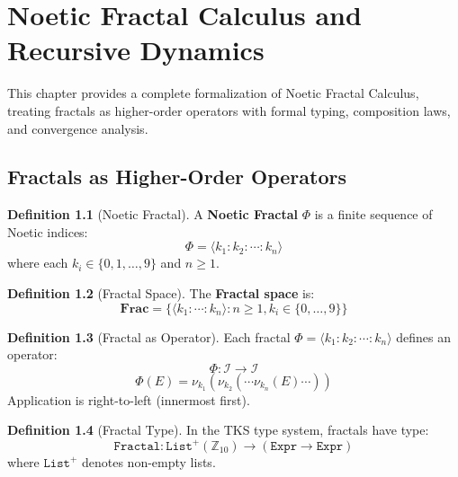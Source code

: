 \documentclass[11pt,twoside,openright]{book}
\theoremstyle{definition}
\newtheorem{definition}{Definition}[chapter]
\theoremstyle{plain}
\theoremstyle{remark}
\newcommand{\Ideas}{\mathcal{I}}
\newcommand{\noe}[1]{\nu_{#1}}
\newcommand{\Frac}{\Phi}
\newcommand{\FracSet}{\mathbf{Frac}}
\begin{document}
\chapter{Noetic Fractal Calculus and Recursive Dynamics}
\label{ch:fractal-calculus}

\begin{tcolorbox}[colback=green!5!white,colframe=green!75!black,title=New in v6.1]
This chapter provides a complete formalization of Noetic Fractal Calculus, treating fractals as higher-order operators with formal typing, composition laws, and convergence analysis.
\end{tcolorbox}

\section{Fractals as Higher-Order Operators}

\begin{definition}[Noetic Fractal]
\label{def:noetic-fractal}
A \textbf{Noetic Fractal} $\Frac$ is a finite sequence of Noetic indices:
\[
\Frac = \langle k_1 : k_2 : \cdots : k_n \rangle
\]
where each $k_i \in \{0, 1, \ldots, 9\}$ and $n \geq 1$.
\end{definition}

\begin{definition}[Fractal Space]
\label{def:fractal-space}
The \textbf{Fractal space} is:
\[
\FracSet = \{\langle k_1 : \cdots : k_n \rangle : n \geq 1, k_i \in \{0, \ldots, 9\}\}
\]
\end{definition}

\begin{definition}[Fractal as Operator]
\label{def:fractal-operator}
Each fractal $\Frac = \langle k_1 : k_2 : \cdots : k_n \rangle$ defines an operator:
\[
\Frac : \Ideas \to \Ideas
\]
\[
\Frac(E) = \noe{k_1}(\noe{k_2}(\cdots\noe{k_n}(E)\cdots))
\]
Application is right-to-left (innermost first).
\end{definition}

\begin{definition}[Fractal Type]
\label{def:fractal-type}
In the TKS type system, fractals have type:
\[
\mathtt{Fractal} : \mathtt{List}^+(\mathbb{Z}_{10}) \to (\mathtt{Expr} \to \mathtt{Expr})
\]
where $\mathtt{List}^+$ denotes non-empty lists.
\end{definition}
\end{document}
